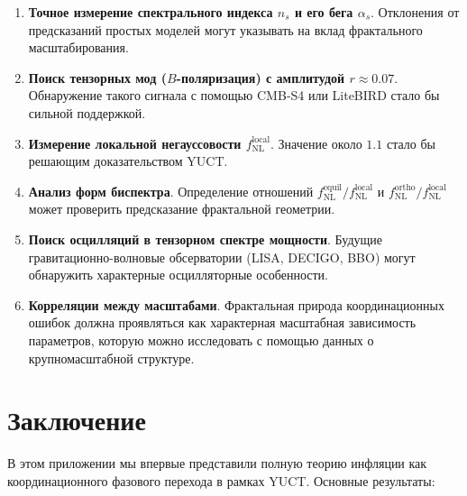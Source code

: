 \documentclass[12pt,a4paper]{article}
\theoremstyle{remark}
\begin{document}
	\begin{enumerate}
		\item \textbf{Точное измерение спектрального индекса $n_s$ и его бега $\alpha_s$}. Отклонения от предсказаний простых моделей могут указывать на вклад фрактального масштабирования.
		\item \textbf{Поиск тензорных мод ($B$-поляризация) с амплитудой $r \approx 0.07$}. Обнаружение такого сигнала с помощью CMB‑S4 или LiteBIRD стало бы сильной поддержкой.
		\item \textbf{Измерение локальной негауссовости $f_{\text{NL}}^{\text{local}}$}. Значение около $1.1$ стало бы решающим доказательством YUCT.
		\item \textbf{Анализ форм биспектра}. Определение отношений $f_{\text{NL}}^{\text{equil}}/f_{\text{NL}}^{\text{local}}$ и $f_{\text{NL}}^{\text{ortho}}/f_{\text{NL}}^{\text{local}}$ может проверить предсказание фрактальной геометрии.
		\item \textbf{Поиск осцилляций в тензорном спектре мощности}. Будущие гравитационно-волновые обсерватории (LISA, DECIGO, BBO) могут обнаружить характерные осцилляторные особенности.
		\item \textbf{Корреляции между масштабами}. Фрактальная природа координационных ошибок должна проявляться как характерная масштабная зависимость параметров, которую можно исследовать с помощью данных о крупномасштабной структуре.
	\end{enumerate}
	
	\section{Заключение}
	\label{sec:conclusion}
	
	В этом приложении мы впервые представили полную теорию инфляции как координационного фазового перехода в рамках YUCT. Основные результаты:
	
\end{document}
